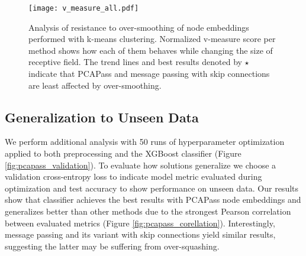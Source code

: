 \documentclass[nohyperref]{article}
\theoremstyle{plain}
\theoremstyle{definition}
\theoremstyle{remark}
\begin{document}
\begin{figure*}[!hbt]
    \vskip 0.2in
    \begin{center}
    \centerline{\texttt{[image: v\_measure\_all.pdf]}}
    \caption{Analysis of resistance to over-smoothing of node embeddings performed with k-means clustering. Normalized v-measure score per method shows how each of them behaves while changing the size of receptive field. The trend lines and best results denoted by \textcolor{black}{\large$\star$} indicate that PCAPass and message passing with skip connections are least affected by over-smoothing.}
    \label{fig:vms}
    \end{center}
    \vskip 0.2in
\end{figure*}

\subsection{Generalization to Unseen Data}
We perform additional analysis with 50 runs of hyperparameter optimization applied to both preprocessing and the XGBoost classifier (Figure \ref{fig:pcapass_validation}). 
To evaluate how solutions generalize we choose a validation cross-entropy loss to indicate model metric evaluated during optimization and test accuracy to show performance on unseen data. 
Our results show that classifier achieves the best results with PCAPass node embeddings and generalizes better than other methods due to the strongest Pearson correlation between evaluated metrics (Figure \ref{fig:pcapass_corellation}).
Interestingly, message passing and its variant with skip connections yield similar results, suggesting the latter may be suffering from over-squashing.
\end{document}
